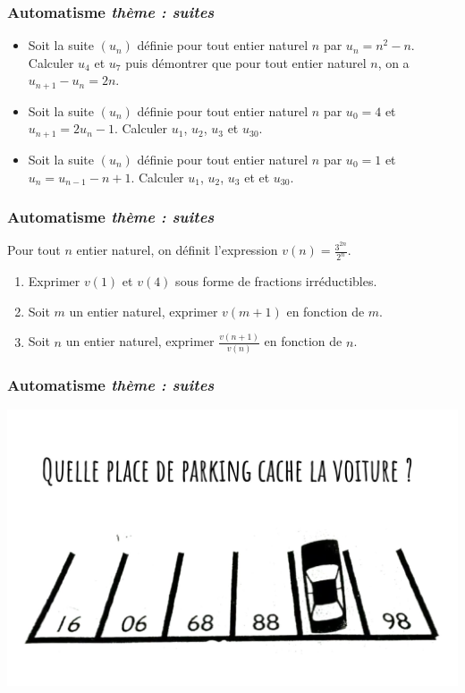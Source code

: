 \documentclass[11pt]{beamer}
\newcommand{\suite}[1]{\ensuremath{\left(#1_{n}\right)}}
\newcounter{autocompteur}
\newcommand{\automatisme}[1]{\addtocounter{autocompteur}{1}\frametitle{Automatisme  \theautocompteur  \textit{ thème : #1}}}
\begin{document}
\begin{frame}
\automatisme{suites}


\begin{itemize}
\item Soit la suite $\suite{u}$ définie pour tout entier naturel $n$ par $u_{n}=n^{2}-n$. Calculer $u_{4}$ et $u_{7}$ puis démontrer que pour tout entier naturel $n$, on a $u_{n+1}-u_{n}=  2n$.
 \item Soit la suite $\suite{u}$ définie pour tout entier naturel $n$ par $u_{0}=4$ et $u_{n+1}=2u_{n}-1$. Calculer $u_{1}$, $u_{2}$, $u_{3}$ et $u_{30}$.
 \item Soit la suite $\suite{u}$ définie pour tout entier naturel $n$ par $u_{0}=1$ et $u_{n}=u_{n-1}-n+1$. Calculer $u_{1}$, $u_{2}$, $u_{3}$ et et $u_{30}$.
\end{itemize}

\end{frame}

\begin{frame}
\automatisme{suites}
Pour tout $n$ entier naturel, on définit l'expression  $v(n)=\frac{3^{2n}}{2^{n}}$.

\begin{enumerate}
\item Exprimer $v(1)$ et $v(4)$ sous forme de fractions irréductibles.
\item Soit $m$ un entier naturel, exprimer $v(m+1)$ en fonction de $m$.
\item Soit $n$ un entier naturel, exprimer $\frac{v(n+1)}{v(n)}$ en fonction de $n$.
\end{enumerate}

\end{frame}

\begin{frame} 
\automatisme{suites}

\begin{center}
\includegraphics[scale=0.1]{ressources/parking.jpeg}
\end{center}
\end{frame}
\end{document}
